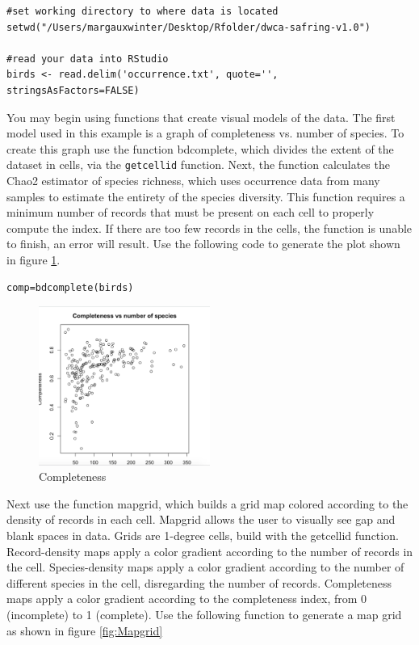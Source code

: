 \begin{lstlisting}
#set working directory to where data is located
setwd("/Users/margauxwinter/Desktop/Rfolder/dwca-safring-v1.0")

#read your data into RStudio
birds <- read.delim('occurrence.txt', quote='', stringsAsFactors=FALSE)
\end{lstlisting}

You may begin using functions that create visual models of the data.
The first model used in this example is a graph of completeness vs. number of species.
To create this graph use the function bdcomplete, which divides the extent of the dataset in cells, via the \texttt{getcellid} function.
Next, the function calculates the Chao2 estimator of species richness, which uses occurrence data from many samples to estimate the entirety of the species diversity.
This function requires a minimum number of records that must be present on each cell to properly compute the index.
If there are too few records in the cells, the function is unable to finish, an error will result.
Use the following code to generate the plot shown in figure \ref{fig:completeness}.

\begin{lstlisting}
comp=bdcomplete(birds)
\end{lstlisting}

\begin{figure}[htbp!]
   \centering
   \includegraphics[width=0.5\textwidth]{pictures/biodiversity/complete.jpg} 
      \caption{Completeness}
   \label{fig:completeness}
\end{figure} 

Next use the function mapgrid, which builds a grid map colored according to the density of records in each cell.
Mapgrid allows the user to visually see gap and blank spaces in data.
Grids are 1-degree cells, build with the getcellid function.
Record-density maps apply a color gradient according to the number of records in the cell.
Species-density maps apply a color gradient according to the number of different species in the cell, disregarding the number of records.
Completeness maps apply a color gradient according to the completeness index, from 0 (incomplete) to 1 (complete).
Use the following function to generate a map grid as shown in figure \ref{fig:Mapgrid}

